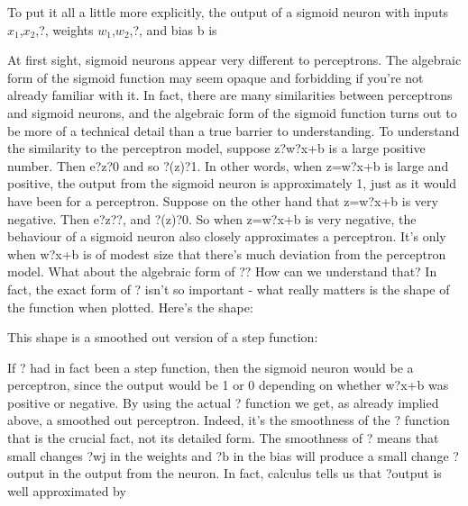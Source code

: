 To put it all a little more explicitly, the output of a sigmoid neuron with inputs $x_1$,$x_2$,?, weights $w_1$,$w_2$,?, and bias b is 

At first sight, sigmoid neurons appear very different to perceptrons. The algebraic form of the sigmoid function may seem opaque and forbidding if you're not already familiar with it. In fact, there are many similarities between perceptrons and sigmoid neurons, and the algebraic form of the sigmoid function turns out to be more of a technical detail than a true barrier to understanding.
To understand the similarity to the perceptron model, suppose z?w?x+b is a large positive number. Then e?z?0 and so ?(z)?1. In other words, when z=w?x+b is large and positive, the output from the sigmoid neuron is approximately 1, just as it would have been for a perceptron. Suppose on the other hand that z=w?x+b is very negative. Then e?z??, and ?(z)?0. So when z=w?x+b is very negative, the behaviour of a sigmoid neuron also closely approximates a perceptron. It's only when w?x+b is of modest size that there's much deviation from the perceptron model.
What about the algebraic form of ?? How can we understand that? In fact, the exact form of ? isn't so important - what really matters is the shape of the function when plotted. Here's the shape:

This shape is a smoothed out version of a step function:


If ? had in fact been a step function, then the sigmoid neuron would be a perceptron, since the output would be 1 or 0 depending on whether w?x+b was positive or negative. By using the actual ? function we get, as already implied above, a smoothed out perceptron. Indeed, it's the smoothness of the ? function that is the crucial fact, not its detailed form. The smoothness of ? means that small changes ?wj in the weights and ?b in the bias will produce a small change ?output in the output from the neuron. In fact, calculus tells us that ?output is well approximated by 


